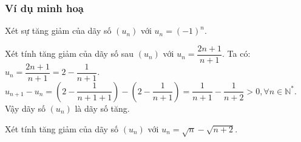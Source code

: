 \subsubsection{Ví dụ minh hoạ}
\begin{vd}%
	Xét sự tăng giảm của dãy số $(u_n)$ với $u_n=(-1)^n$.
\end{vd}
\begin{vd}%
	Xét tính tăng giảm của dãy số sau $(u_n)$ với $u_n=\dfrac{2n+1}{n+1}$.
	\loigiai
	{
		Ta có: $u_n=\dfrac{2n+1}{n+1}=2-\dfrac{1}{n+1}$.\\
		$u_{n+1}-u_n=\left(2-\dfrac{1}{n+1+1}\right)-\left(2-\dfrac{1}{n+1}\right)=\dfrac{1}{n+1}-\dfrac{1}{n+2}>0, \forall n \in \mathbb{N}^\ast$.\\
		Vậy dãy số $(u_n)$ là dãy số tăng.
	}
\end{vd}
\begin{vd}%
	Xét tính tăng giảm của dãy số $(u_n)$ với $u_n=\sqrt{n}-\sqrt{n+2}$.
\end{vd}

